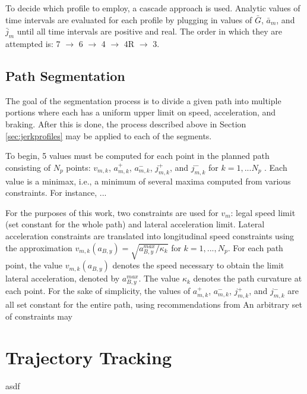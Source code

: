 \documentclass[letterpaper, 10 pt, conference]{ieeeconf}  %
\begin{document}
To decide which profile to employ, a cascade approach is used. Analytic values of time intervals are evaluated for each profile by plugging in values of $\bar{G}$, $\bar{a}_m$, and $\bar{j}_m$ until all time intervals are positive and real. 
The order in which they are attempted is: 7 $\rightarrow$ 6 $\rightarrow$ 4 $\rightarrow$ 4R $\rightarrow$ 3.

\subsection{Path Segmentation}
\label{sec:pathsegmentation}

The goal of the segmentation process is to divide a given path into multiple portions where each has a uniform upper limit on speed, acceleration, and braking.
After this is done, the process described above in Section \ref{sec:jerkprofiles} may be applied to each of the segments.

To begin, 5 values must be computed for each point in the planned path consisting of $N_p$ points: $v_{m,k}$, $a^+_{m,k}$, $a^-_{m,k}$, $j^+_{m,k}$, and $j^-_{m,k}$ for $k = 1, ... N_p$ . Each value is a minimax, i.e., a minimum of several maxima computed from various constraints. For instance, ...

For the purposes of this work, two constraints are used for $v_m$: legal speed limit (set constant for the whole path) and lateral acceleration limit. Lateral acceleration constraints are translated into longitudinal speed constraints using the approximation $v_{m,k}(a_{B,y}) = \sqrt{a_{B,y}^{max}/\kappa_k}$ for $k = 1, ..., N_p$. For each path point, the value $v_{m,k}(a_{B,y})$ denotes the speed necessary to obtain the limit lateral acceleration, denoted by $a^{max}_{B,y}$. The value $\kappa_k$ denotes the path curvature at each point. For the sake of simplicity, the values of $a^+_{m,k}$, $a^-_{m,k}$, $j^+_{m,k}$, and $j^-_{m,k}$ are all set constant for the entire path, using recommendations from \cite{Maurya2012}
An arbitrary set of constraints may 

\section{Trajectory Tracking}
\label{sec:trajectorytracking}

asdf





\end{document}
